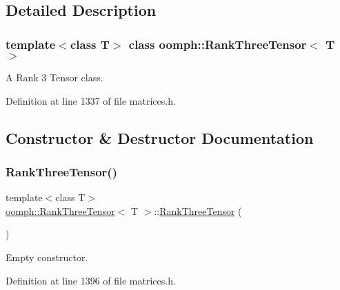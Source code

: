 \subsection{Detailed Description}
\subsubsection*{template$<$class T$>$\newline
class oomph\+::\+Rank\+Three\+Tensor$<$ T $>$}

A Rank 3 Tensor class. 

Definition at line 1337 of file matrices.\+h.



\subsection{Constructor \& Destructor Documentation}
\mbox{\label{classoomph_1_1RankThreeTensor_a8f2c4cf96f9e6c1c66e6958fd52b0b76}} 
\subsubsection{\texorpdfstring{Rank\+Three\+Tensor()}{RankThreeTensor()}\hspace{0.1cm}{\footnotesize\ttfamily [1/5]}}
{\footnotesize\ttfamily template$<$class T$>$ \\
\hyperlink{classoomph_1_1RankThreeTensor}{oomph\+::\+Rank\+Three\+Tensor}$<$ T $>$\+::\hyperlink{classoomph_1_1RankThreeTensor}{Rank\+Three\+Tensor} (\begin{DoxyParamCaption}{ }\end{DoxyParamCaption})\hspace{0.3cm}{\ttfamily [inline]}}



Empty constructor. 



Definition at line 1396 of file matrices.\+h.

\mbox{\label{classoomph_1_1RankThreeTensor_a7de68d66eec11565e0ffb55494fd66c6}} 
